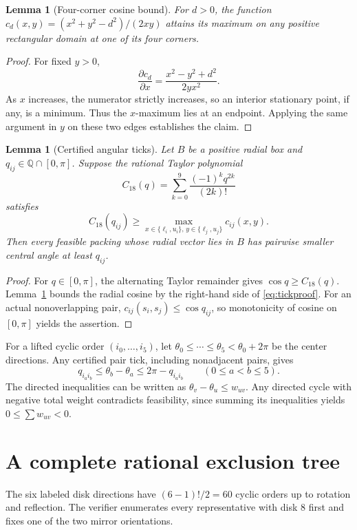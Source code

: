 \documentclass[10pt,a4paper]{article}
\newtheorem{lemma}[theorem]{Lemma}
\newcommand{\Q}{\mathbb Q}
\begin{document}
\begin{lemma}[Four-corner cosine bound]\label{lem:corners}
For $d>0$, the function $c_d(x,y)=(x^2+y^2-d^2)/(2xy)$ attains its maximum on any positive rectangular domain at one of its four corners.
\end{lemma}
\begin{proof}
For fixed $y>0$,
\[
\frac{\partial c_d}{\partial x}=\frac{x^2-y^2+d^2}{2yx^2}.
\]
As $x$ increases, the numerator strictly increases, so an interior stationary point, if any, is a minimum. Thus the $x$-maximum lies at an endpoint. Applying the same argument in $y$ on these two edges establishes the claim.
\end{proof}

\begin{lemma}[Certified angular ticks]\label{lem:ticks}
Let $B$ be a positive radial box and $q_{ij}\in\Q\cap[0,\pi]$. Suppose the rational Taylor polynomial
\[
 C_{18}(q)=\sum_{k=0}^{9}\frac{(-1)^kq^{2k}}{(2k)!}
\]
satisfies
\begin{equation}\label{eq:tickproof}
 C_{18}(q_{ij})\ge
 \max_{x\in\{\ell_i,u_i\},\,y\in\{\ell_j,u_j\}}c_{ij}(x,y).
\end{equation}
Then every feasible packing whose radial vector lies in $B$ has pairwise smaller central angle at least $q_{ij}$.
\end{lemma}
\begin{proof}
For $q\in[0,\pi]$, the alternating Taylor remainder gives $\cos q\ge C_{18}(q)$. Lemma~\ref{lem:corners} bounds the radial cosine by the right-hand side of \eqref{eq:tickproof}. For an actual nonoverlapping pair, $c_{ij}(s_i,s_j)\le\cos q_{ij}$, so monotonicity of cosine on $[0,\pi]$ yields the assertion.
\end{proof}

For a lifted cyclic order $(i_0,\ldots,i_5)$, let
$\theta_0\le\cdots\le\theta_5<\theta_0+2\pi$ be the center directions.
Any certified pair tick, including nonadjacent pairs, gives
\begin{equation}\label{eq:diff}
 q_{i_ai_b}\le\theta_b-\theta_a\le2\pi-q_{i_ai_b}\qquad(0\le a<b\le5).
\end{equation}
The directed inequalities can be written as $\theta_v-\theta_u\le w_{uv}$. Any directed cycle with negative total weight contradicts feasibility, since summing its inequalities yields $0\le\sum w_{uv}<0$.

\section{A complete rational exclusion tree}\label{sec:tree}
The six labeled disk directions have $(6-1)!/2=60$ cyclic orders up to rotation and reflection. The verifier enumerates every representative with disk $8$ first and fixes one of the two mirror orientations.
\end{document}
